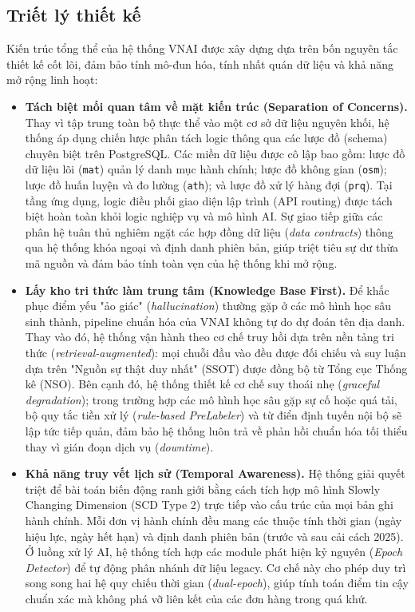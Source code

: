 \subsection{Triết lý thiết kế}
\label{sec:triet-ly}

Kiến trúc tổng thể của hệ thống VNAI được xây dựng dựa trên bốn nguyên tắc thiết kế cốt lõi, đảm bảo tính mô-đun hóa, tính nhất quán dữ liệu và khả năng mở rộng linh hoạt:

\begin{itemize}[leftmargin=*]
\item \textbf{Tách biệt mối quan tâm về mặt kiến trúc (Separation of Concerns).} 
Thay vì tập trung toàn bộ thực thể vào một cơ sở dữ liệu nguyên khối, hệ thống áp dụng chiến lược phân tách logic thông qua các lược đồ (schema) chuyên biệt trên PostgreSQL. Các miền dữ liệu được cô lập bao gồm: lược đồ dữ liệu lõi (\texttt{mat}) quản lý danh mục hành chính; lược đồ không gian (\texttt{osm}); lược đồ huấn luyện và đo lường (\texttt{ath}); và lược đồ xử lý hàng đợi (\texttt{prq}). Tại tầng ứng dụng, logic điều phối giao diện lập trình (API routing) được tách biệt hoàn toàn khỏi logic nghiệp vụ và mô hình AI. Sự giao tiếp giữa các phân hệ tuân thủ nghiêm ngặt các hợp đồng dữ liệu (\textit{data contracts}) thông qua hệ thống khóa ngoại và định danh phiên bản, giúp triệt tiêu sự dư thừa mã nguồn và đảm bảo tính toàn vẹn của hệ thống khi mở rộng.

\item \textbf{Lấy kho tri thức làm trung tâm (Knowledge Base First).} 
Để khắc phục điểm yếu "ảo giác" (\textit{hallucination}) thường gặp ở các mô hình học sâu sinh thành, pipeline chuẩn hóa của VNAI không tự do dự đoán tên địa danh. Thay vào đó, hệ thống vận hành theo cơ chế truy hồi dựa trên nền tảng tri thức (\textit{retrieval-augmented}): mọi chuỗi đầu vào đều được đối chiếu và suy luận dựa trên "Nguồn sự thật duy nhất" (SSOT) được đồng bộ từ Tổng cục Thống kê (NSO). Bên cạnh đó, hệ thống thiết kế cơ chế suy thoái nhẹ (\textit{graceful degradation}); trong trường hợp các mô hình học sâu gặp sự cố hoặc quá tải, bộ quy tắc tiền xử lý (\textit{rule-based PreLabeler}) và từ điển định tuyến nội bộ sẽ lập tức tiếp quản, đảm bảo hệ thống luôn trả về phản hồi chuẩn hóa tối thiểu thay vì gián đoạn dịch vụ (\textit{downtime}).

\item \textbf{Khả năng truy vết lịch sử (Temporal Awareness).} 
Hệ thống giải quyết triệt để bài toán biến động ranh giới bằng cách tích hợp mô hình Slowly Changing Dimension (SCD Type 2) trực tiếp vào cấu trúc của mọi bản ghi hành chính. Mỗi đơn vị hành chính đều mang các thuộc tính thời gian (ngày hiệu lực, ngày hết hạn) và định danh phiên bản (trước và sau cải cách 2025). Ở luồng xử lý AI, hệ thống tích hợp các module phát hiện kỷ nguyên (\textit{Epoch Detector}) để tự động phân nhánh dữ liệu legacy. Cơ chế này cho phép duy trì song song hai hệ quy chiếu thời gian (\textit{dual-epoch}), giúp tính toán điểm tin cậy chuẩn xác mà không phá vỡ liên kết của các đơn hàng trong quá khứ.


\end{itemize}
